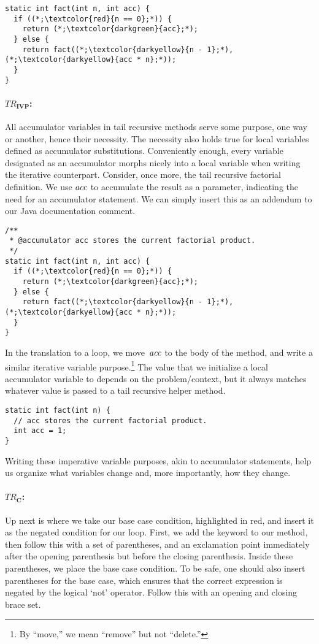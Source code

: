 \begin{lstlisting}[language=MyJava]
static int fact(int n, int acc) {
  if ((*;\textcolor{red}{n == 0};*)) {
    return (*;\textcolor{darkgreen}{acc};*);
  } else {
    return fact((*;\textcolor{darkyellow}{n - 1};*), (*;\textcolor{darkyellow}{acc * n};*));
  }
}
\end{lstlisting}

\paragraph{\emph{$TR_\mathbf{IVP}$}:} All accumulator variables in tail recursive methods serve some purpose, one way or another, hence their necessity. 
The necessity also holds true for local variables defined as accumulator substitutions. 
Conveniently enough, every variable designated as an accumulator morphs nicely into a local variable when writing the iterative counterpart. 
Consider, once more, the tail recursive factorial definition. 
We use $\emph{acc}$ to accumulate the result as a parameter, indicating the need for an accumulator statement. 
We can simply insert this as an addendum to our Java documentation comment.

\begin{lstlisting}[language=MyJava]
/**
 * @accumulator acc stores the current factorial product. 
 */
static int fact(int n, int acc) {
  if ((*;\textcolor{red}{n == 0};*)) {
    return (*;\textcolor{darkgreen}{acc};*);
  } else {
    return fact((*;\textcolor{darkyellow}{n - 1};*), (*;\textcolor{darkyellow}{acc * n};*));
  }
}
\end{lstlisting}

In the translation to a loop, we move~$\emph{acc}$ to the body of the method, and write a similar iterative variable purpose.\footnote{By ``move,'' we mean ``remove'' but not ``delete.''} 
The value that we initialize a local accumulator variable to depends on the problem/context, but it always matches whatever value is passed to a tail recursive helper method.

\begin{lstlisting}[language=MyJava]
static int fact(int n) {
  // acc stores the current factorial product. 
  int acc = 1;
}
\end{lstlisting}

Writing these imperative variable purposes, akin to accumulator statements, help us organize what variables change and, more importantly, how they change. 

\paragraph{\emph{$TR_\mathbf{C}$}:} Up next is where we take our base case condition, highlighted in red, and insert it as the negated condition for our loop. 
First, we add the  keyword to our method, then follow this with a set of parentheses, and an exclamation point immediately after the opening parenthesis but before the closing parenthesis. 
Inside these parentheses, we place the base case condition. 
To be safe, one should also insert parentheses for the base case, which ensures that the correct expression is negated by the logical `not' operator. 
Follow this with an opening and closing brace set.

